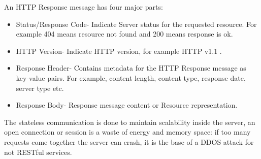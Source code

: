 An HTTP Response message has four major parts:
\begin{itemize}	

	\item Status/Response Code- Indicate Server status for the requested resource. For example 404 means resource not found and 200 means response is ok.
	
	\item HTTP Version- Indicate HTTP version, for example HTTP v1.1 .

	\item Response Header- Contains metadata for the HTTP Response message as key-value pairs. For example, content length, content type, response date, server type etc.
	
	\item Response Body- Response message content or Resource representation.

\end{itemize}

The stateless communication is done to maintain scalability inside the server, an open connection or session is a waste of energy and memory space: if too many requests come together the server can crash, it is the base of a DDOS attack for not RESTful services.


